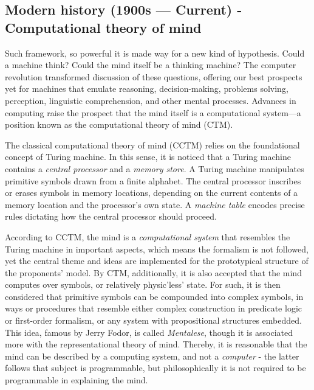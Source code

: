\subsection{Modern history (1900s --- Current) - Computational theory of mind}

Such framework, so powerful it is made way for a new kind of hypothesis. Could a machine think? Could the mind itself be a thinking machine? The computer revolution transformed discussion of these questions, offering our best prospects yet for machines that emulate reasoning, decision-making, problems solving, perception, linguistic comprehension, and other mental processes. Advances in computing raise the prospect that the mind itself is a computational system—a position known as the computational theory of mind (CTM).

The classical computational theory of mind (CCTM) \cite{compmodel2016} relies on the foundational concept of Turing machine. In this sense, it is noticed that a Turing machine contains a \textit{central processor} and a \textit{memory store}. A Turing machine manipulates primitive symbols drawn from a finite alphabet. The central processor inscribes or erases symbols in memory locations, depending on the current contents of a memory location and the processor's own state. A \textit{machine table} encodes precise rules dictating how the central processor should proceed. 

According to CCTM, the mind is a \textit{computational system} that resembles the Turing machine in important aspects, which means the formalism is not followed, yet the central theme and ideas are implemented for the prototypical structure of the proponents' model. By CTM, additionally, it is also accepted that the mind computes over symbols, or relatively physic'less' state. For such, it is then considered that primitive symbols can be compounded into complex symbols, in ways or procedures that resemble either complex construction in predicate logic or first-order formalism, or any system with propositional structures embedded. This idea, famous by Jerry Fodor, is called \textit{Mentalese}, though it is associated more with the representational theory of mind. Thereby, it is reasonable that the mind can be described by a computing system, and not a \textit{computer} - the latter follows that subject is programmable, but philosophically it is not required to be programmable in explaining the mind. 

